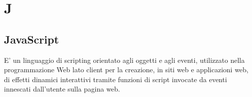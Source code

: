 \section*{J}

\subsection{JavaScript}
E' un linguaggio di scripting orientato agli oggetti e agli eventi, utilizzato nella programmazione Web lato client per la creazione, in siti web e applicazioni web, di effetti dinamici interattivi tramite funzioni di script invocate da eventi innescati dall'utente sulla pagina web.